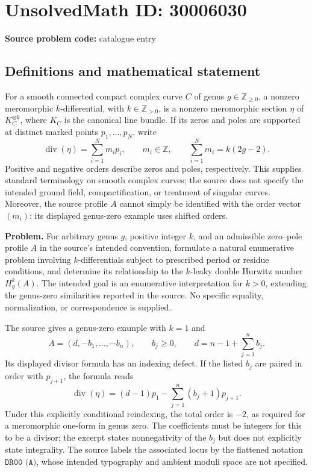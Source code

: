 \documentclass[11pt]{article}
\newcommand{\Z}{\mathbb{Z}}
\begin{document}
\section*{UnsolvedMath ID: 30006030}
\textbf{Source problem code:} catalogue entry
\subsection{Definitions and mathematical statement}
For a smooth connected compact complex curve \(C\) of genus \(g\in\Z_{\geq 0}\), a nonzero meromorphic \(k\)-differential, with \(k\in\Z_{>0}\), is a nonzero meromorphic section \(\eta\) of \(K_C^{\otimes k}\), where \(K_C\) is the canonical line bundle. If its zeros and poles are supported at distinct marked points \(p_1,\ldots,p_N\), write
\[
\operatorname{div}(\eta)=\sum_{i=1}^{N}m_i p_i,
\qquad m_i\in\Z,
\qquad \sum_{i=1}^{N}m_i=k(2g-2).
\]
Positive and negative orders describe zeros and poles, respectively. This supplies standard terminology on smooth complex curves; the source does not specify the intended ground field, compactification, or treatment of singular curves. Moreover, the source profile \(A\) cannot simply be identified with the order vector \((m_i)\): its displayed genus-zero example uses shifted orders.

\textbf{Problem.} For arbitrary genus \(g\), positive integer \(k\), and an admissible zero--pole profile \(A\) in the source's intended convention, formulate a natural enumerative problem involving \(k\)-differentials subject to prescribed period or residue conditions, and determine its relationship to the \(k\)-leaky double Hurwitz number \(H_g^k(A)\). The intended goal is an enumerative interpretation for \(k>0\), extending the genus-zero similarities reported in the source. No specific equality, normalization, or correspondence is supplied.

The source gives a genus-zero example with \(k=1\) and
\[
A=(d,-b_1,\ldots,-b_n),\qquad b_j\geq 0,
\qquad d=n-1+\sum_{j=1}^{n}b_j.
\]
Its displayed divisor formula has an indexing defect. If the listed \(b_j\) are paired in order with \(p_{j+1}\), the formula reads
\[
\operatorname{div}(\eta)
=(d-1)p_1-\sum_{j=1}^{n}(b_j+1)p_{j+1}.
\]
Under this explicitly conditional reindexing, the total order is \(-2\), as required for a meromorphic one-form in genus zero. The coefficients must be integers for this to be a divisor; the excerpt states nonnegativity of the \(b_j\) but does not explicitly state integrality. The source labels the associated locus by the flattened notation \(\texttt{DR00 (A)}\), whose intended typography and ambient moduli space are not specified.
\end{document}
